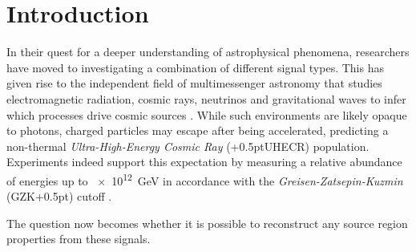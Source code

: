 \chapter{Introduction}
\label{ch:introduction}

In their quest for a deeper understanding of astrophysical phenomena, researchers have moved to investigating
a combination of different signal types. This has given rise to the independent field of multimessenger astronomy
that studies electromagnetic radiation, cosmic rays, neutrinos and gravitational waves to infer which processes
drive cosmic sources \cite{Meszaros_2019}. While such environments are likely opaque to photons, charged particles
may escape after being accelerated, predicting a non-thermal \emph{Ultra-High-Energy Cosmic Ray} ({\kern+0.5pt}UHECR)
population. Experiments indeed support this expectation by measuring a relative abundance of energies up to
\qty{e12}{\giga\electronvolt} in accordance with the \emph{Greisen-Zatsepin-Kuzmin} (GZK{\kern+0.5pt}) cutoff
\cite{pierre_auger_cosmic_rays}.

The question now becomes whether it is possible to reconstruct any source region properties from these signals.
